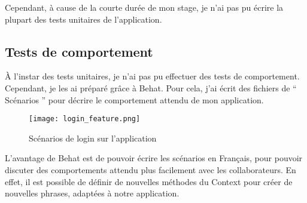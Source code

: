 Cependant, à cause de la courte durée de mon stage, je n'ai pas pu écrire la plupart des tests unitaires de l'application.

\subsection{Tests de comportement}

À l'instar des tests unitaires, je n'ai pas pu effectuer des tests de comportement. Cependant, je les ai préparé grâce à Behat. Pour cela, j'ai écrit des fichiers de `` Scénarios '' pour décrire le comportement attendu de mon application.

\begin{figure}[H]
\begin{center}
\texttt{[image: login\_feature.png]}
\end{center}
\caption{Scénarios de login sur l'application}
\end{figure}

L'avantage de Behat est de pouvoir écrire les scénarios en Français, pour pouvoir discuter des comportements attendu plus facilement avec les collaborateurs. En effet, il est possible de définir de nouvelles méthodes du Context pour créer de nouvelles phrases, adaptées à notre application.